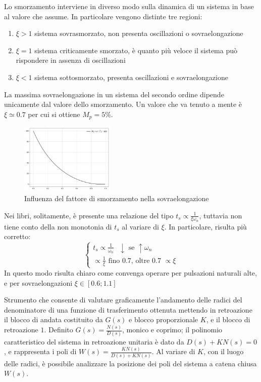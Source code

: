 Lo smorzamento interviene in diverso modo sulla dinamica di un sistema in base al valore che assume. In particolare vengono distinte tre regioni:
\begin{enumerate}
    \item \(\xi > 1\) sistema sovrasmorzato, non presenta oscillazioni o sovraelongazione
    \item \(\xi = 1\) sistema criticamente smorzato, è quanto più veloce il sistema può rispondere in assenza di oscillazioni
    \item \(\xi < 1\) sistema sottosmorzato, presenta oscillazioni e sovraelongazione
\end{enumerate}

La massima sovraelongazione in un sistema del secondo ordine dipende unicamente dal valore dello smorzamento. Un valore che va tenuto a mente è \(\xi \simeq 0.7\) per cui si ottiene \(M_p = 5\%\).

\begin{figure}[h]
    \centering
    \includegraphics[width=0.4\textwidth]{Immagini/sovraelongazione_xi.png}
    \caption{Influenza del fattore di smorzamento nella sovraelongazione}
\end{figure}

Nei libri, solitamente, è presente una relazione del tipo \(t_s \propto \frac{1}{\xi \omega_n} \), tuttavia non tiene conto della non monotonia di \(t_s\) al variare di \(\xi\).
In particolare, risulta più corretto:
\[
\begin{cases}
    t_s \propto \frac{1}{\omega_n} \text{ \ } \downarrow \text{\ se \ } \uparrow \omega_n \\
    \propto \frac{1}{\xi} \text{\ fino 0.7, oltre 0.7 \ } \propto \xi
\end{cases}
\]
In questo modo risulta chiaro come convenga operare per pulsazioni naturali alte, e per sovraelongazioni \(\xi \in [0.6;1.1]\) {\color{red}{Come mai in questo range, cosa significa?}}

Strumento che consente di valutare graficamente l'andamento delle radici del denominatore di una funzione di trasferimento ottenuta mettendo in retroazione il blocco di andata costituito da $G(s)$ e blocco proporzionale $K$, e il blocco di retroazione $1$. 
Definito $G(s)=\frac{N(s)}{D(s)}$, monico e coprimo; il polinomio caratteristico del sistema in retroazione unitaria è dato da $D(s) + K N(s) = 0$, e rappresenta i poli di $W(s)=\frac{K N(s)}{D(s) + K N(s)}$. Al variare di $K$, con il luogo delle radici, è possibile analizzare la posizione dei poli del sistema a catena chiusa $W(s)$.

